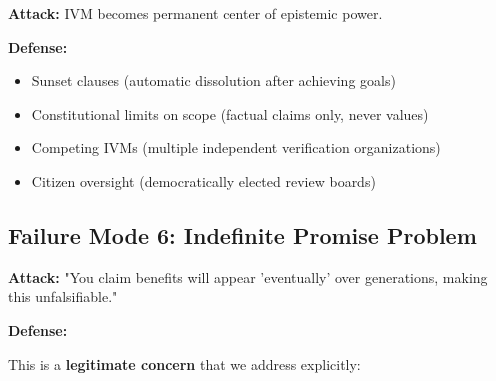 \documentclass[11pt,a4paper]{article}
\theoremstyle{definition}
\theoremstyle{remark}
\begin{document}
\textbf{Attack:} IVM becomes permanent center of epistemic power.

\textbf{Defense:}
\begin{itemize}
\item Sunset clauses (automatic dissolution after achieving goals)
\item Constitutional limits on scope (factual claims only, never values)
\item Competing IVMs (multiple independent verification organizations)
\item Citizen oversight (democratically elected review boards)
\end{itemize}


\subsection{Failure Mode 6: Indefinite Promise Problem}

\textbf{Attack:} "You claim benefits will appear 'eventually' over generations, making this unfalsifiable."

\textbf{Defense:}

This is a \textbf{legitimate concern} that we address explicitly:
\end{document}
